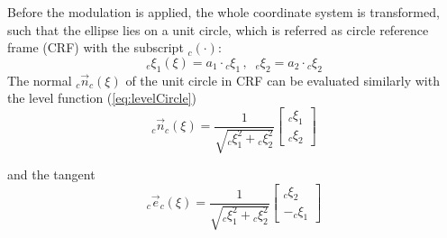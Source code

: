 Before the modulation is applied, the whole coordinate system is transformed, such that the ellipse lies on a unit circle, which is referred as circle reference frame (CRF) with the subscript ${}_c(\cdot)$:
\begin{equation}
  {}_e \xi_1 (\xi) = a_1 \cdot {}_c\xi_1 \, , \;\; {}_e \xi_2 = a_2 \cdot {}_c\xi_2 \label{eq:ellipseCircleTrafo}
\end{equation}
The normal ${}_c \vec n _{c} (\xi)$ of the unit circle in CRF can be evaluated similarly with the level function (\ref{eq:levelCircle})
\begin{equation}
  {}_c \vec{n}_{c} (\xi) =
  \frac{1}{\sqrt{ {}_c\xi_1^2 + {}_c \xi_2^2}}
  \begin{bmatrix}
     {}_c\xi_1 \\
     {}_c\xi_2
  \end{bmatrix}
\end{equation}

and the tangent
\begin{equation}
  {}_c \vec{e}_{c} (\xi) =
  \frac{1}{\sqrt{ {}_c\xi_1^2 + {}_c \xi_2^2}}
  \begin{bmatrix}
     {}_c\xi_2 \\
     - {}_c\xi_1
  \end{bmatrix}
\end{equation}


